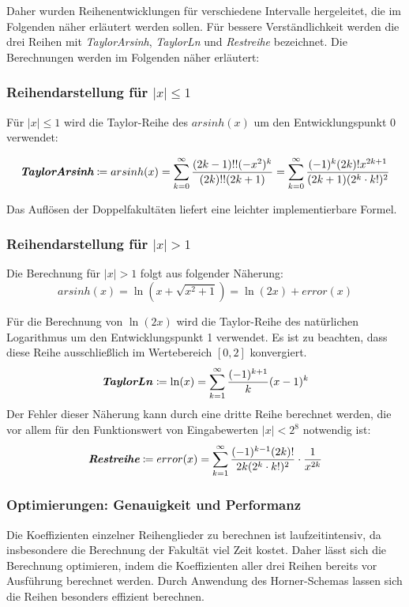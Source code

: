 \documentclass[course=erap] {aspdoc}
\begin{document}
    Daher wurden Reihenentwicklungen für verschiedene Intervalle hergeleitet, die im Folgenden näher erläutert werden sollen.
    Für bessere Verständlichkeit werden die drei Reihen mit \textit{TaylorArsinh}, \textit{TaylorLn} und \textit{Restreihe} bezeichnet.
    Die Berechnungen werden im Folgenden näher erläutert:

    \subsubsection{Reihendarstellung für $|x|\leq 1$}
    Für $|x| \leq 1$ wird die Taylor-Reihe\cite{taylor_series} des $arsinh(x)$ um den Entwicklungspunkt 0 verwendet:

    \[
        \textit{\textbf{TaylorArsinh}}\coloneqq arsinh(x) = \sum_{k = 0}^{\infty} \frac{(2k-1)!!(-x^2)^k}{(2k)!!(2k + 1)}
        = \sum_{k = 0}^{\infty} \frac{(-1)^k(2k)!x^{2k + 1}}{(2k + 1)(2^k \cdot k!)^2}
    \]

    Das Auflösen der Doppelfakultäten liefert eine leichter implementierbare Formel.

    \subsubsection{Reihendarstellung für $|x| > 1$}
    Die Berechnung für $|x| > 1$ folgt aus folgender Näherung:
    \[
        arsinh(x) = \ln(x + \sqrt{x^2 + 1}) = \ln(2x) + error(x)
    \]

    Für die Berechnung von $\ln(2x)$ wird die Taylor-Reihe\cite{taylor_series} des natürlichen Logarithmus um den Entwicklungspunkt 1 verwendet.
    Es ist zu beachten, dass diese Reihe ausschließlich im Wertebereich $[0, 2]$ konvergiert.
    \[
        \textbf{\textit{TaylorLn}}\coloneqq\ln(x) = \sum_{k = 1}^{\infty} \frac{(-1)^{k + 1}}{k}(x - 1)^k
    \]
    Der Fehler dieser Näherung kann durch eine dritte Reihe\cite{rest_series} berechnet werden, die vor allem für den Funktionswert von Eingabewerten $|x| < 2^{8}$ notwendig ist:
    \[
        \textit{\textbf{Restreihe}}\coloneqq error(x) =  \sum_{k = 1}^{\infty} \frac{(-1)^{k - 1}(2k)!}{2k(2^k\cdot k!)^2} \cdot \frac{1}{x^{2k}}
    \]

    \subsubsection{Optimierungen: Genauigkeit und Performanz}

    Die Koeffizienten einzelner Reihenglieder zu berechnen ist laufzeitintensiv, da insbesondere die Berechnung der Fakultät viel Zeit kostet.
    Daher lässt sich die Berechnung optimieren, indem die Koeffizienten aller drei Reihen bereits vor Ausführung berechnet werden.
    Durch Anwendung des Horner-Schemas lassen sich die Reihen besonders effizient berechnen.
\end{document}

